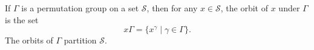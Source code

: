 If $\Gamma$ is a permutation group on a set $\mathcal{S}$, then for any $x \in \mathcal{S}$, the orbit of $x$ under $\Gamma$ is the set
$$x\Gamma = \{x^\gamma \mid \gamma \in \Gamma\}.$$
The orbits of $\Gamma$ partition $\mathcal{S}$.
